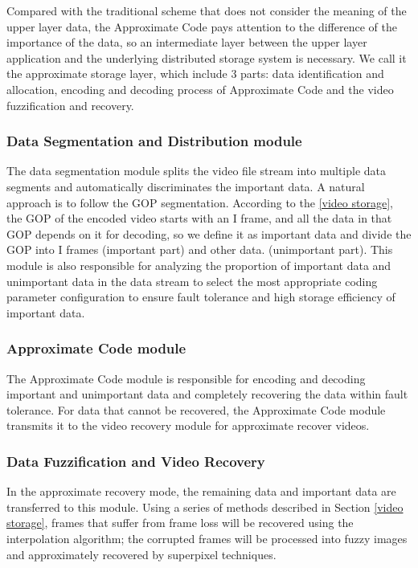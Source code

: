 \documentclass[sigconf]{acmart}
\begin{document}
Compared with the traditional scheme that does not consider the meaning of the upper layer data, the Approximate Code pays attention to the difference of the importance of the data, so an intermediate layer between the upper layer application and the underlying distributed storage system is necessary. We call it the approximate storage layer, which include 3 parts: data identification and allocation, encoding and decoding process of Approximate Code and the video fuzzification and recovery.

\subsubsection{Data Segmentation and Distribution module}
The data segmentation module splits the video file stream into multiple data segments and automatically discriminates the important data. A natural approach is to follow the GOP segmentation. According to the \ref{video storage}, the GOP of the encoded video starts with an I frame, and all the data in that GOP depends on it for decoding, so we define it as important data and divide the GOP into I frames (important part) and other data. (unimportant part).
This module is also responsible for analyzing the proportion of important data and unimportant data in the data stream to select the most appropriate coding parameter configuration to ensure fault tolerance and high storage efficiency of important data.

\subsubsection{Approximate Code module}
The Approximate Code module is responsible for encoding and decoding important and unimportant data and completely recovering the data within fault tolerance. For data that cannot be recovered, the Approximate Code module transmits it to the video recovery module for approximate recover videos.

\subsubsection{Data Fuzzification and Video Recovery}
In the approximate recovery mode, the remaining data and important data are transferred to this module. Using a series of methods described in Section \ref{video storage}, frames that suffer from frame loss will be recovered using the interpolation algorithm; the corrupted frames will be processed into fuzzy images and approximately recovered by superpixel techniques.
\end{document}
